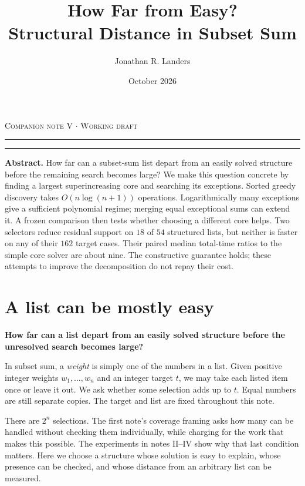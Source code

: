 \documentclass[10pt,english]{article}
\title{\sffamily\bfseries How Far from Easy?\\ Structural Distance in Subset Sum}
\author{Jonathan R. Landers}
\date{October 2026}
\begin{document}
\maketitle
\vspace{-1em}
\noindent\textcolor{paperaccent}{\footnotesize\textsc{Companion note V \(\cdot\) Working draft}}
\par\noindent\textcolor{paperaccent}{\rule{.11\linewidth}{1.5pt}}\textcolor{paperline}{\rule{.89\linewidth}{.45pt}}
\vspace{.65em}

\begin{tcolorbox}[accentbox]
\textbf{Abstract.} How far can a subset-sum list depart from an easily solved structure before the remaining search becomes large? We make this question concrete by finding a largest superincreasing core and searching its exceptions. Sorted greedy discovery takes \(O(n\log(n+1))\) operations. Logarithmically many exceptions give a sufficient polynomial regime; merging equal exceptional sums can extend it. A frozen comparison then tests whether choosing a different core helps. Two selectors reduce residual support on \(18\) of \(54\) structured lists, but neither is faster on any of their \(162\) target cases. Their paired median total-time ratios to the simple core solver are about nine. The constructive guarantee holds; these attempts to improve the decomposition do not repay their cost.
\end{tcolorbox}

\section{A list can be mostly easy}
\textbf{How far can a list depart from an easily solved structure before the unresolved search becomes large?}

In subset sum, a \emph{weight} is simply one of the numbers in a list. Given positive integer weights \(w_1,\ldots,w_n\) and an integer target \(t\), we may take each listed item once or leave it out. We ask whether some selection adds up to \(t\). Equal numbers are still separate copies. The target and list are fixed throughout this note.

There are \(2^n\) selections. The first note's coverage framing asks how many can be handled without checking them individually, while charging for the work that makes this possible. The experiments in notes II--IV show why that last condition matters. Here we choose a structure whose solution is easy to explain, whose presence can be checked, and whose distance from an arbitrary list can be measured.
\end{document}
